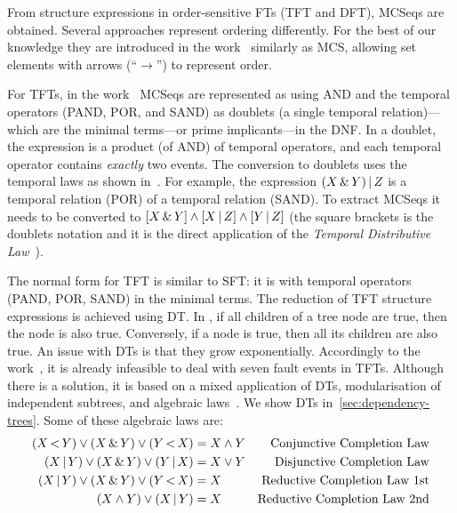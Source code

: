 \documentclass[12pt,openright,twoside,a4paper,oldfontcommands,english,brazil,final]{abntex2}
\theoremstyle{theo}
\newcommand{\parsin}[1]{\ensuremath\left( #1 \right)}
\newcommand{\squaresin}[1]{\ensuremath\left[ #1 \right]}
\def\pand{\ensuremath\operatorname{<}}
\def\por{\ensuremath\operatorname{|}}
\def\sand{\ensuremath\operatorname{\&}}
\begin{document}
From structure expressions in order-sensitive \acp{FT} (\ac{TFT} and \ac{DFT}), \acp{MCSeq} are obtained.
Several approaches represent  ordering differently.
For the best of our knowledge they are introduced in the work~\cite{TD2004} similarly as \ac{MCS}, allowing set elements with arrows (``$\rightarrow$'') to represent order.

For \acp{TFT}, in the work~\cite{Walker2009} \acp{MCSeq} are represented as  using \ac{AND} and the temporal operators (\ac{PAND}, \ac{POR}, and \ac{SAND}) as doublets (a single temporal relation)---which are the minimal terms---or prime implicants---in the \ac{DNF}.
In a doublet, the expression is a product (of \ac{AND}) of temporal operators, and each temporal operator contains \emph{exactly} two events.
The conversion to doublets uses the temporal laws as shown in~\cite{Walker2009}.
For example, the expression $\parsin{X \sand Y} \por Z$ is a temporal relation (\ac{POR}) of a temporal relation (\ac{SAND}).
To extract \acp{MCSeq} it needs to be converted to $\squaresin{X \sand Y} \land \squaresin{X \por Z} \land \squaresin{Y \por Z} $ (the square brackets is the doublets notation and it is the direct application of the \emph{Temporal Distributive Law}~\cite[p. 120]{Walker2009}).

The normal form for \ac{TFT} is similar to \ac{SFT}: it is  with temporal operators (\ac{PAND}, \ac{POR}, \ac{SAND}) in the minimal terms.
The reduction of \ac{TFT} structure expressions is achieved using \ac{DT}.
In , if all children of a tree node are true, then the node is also true.
Conversely, if a node is true, then all its children are also true.
An issue with \acp{DT} is that they grow exponentially.
Accordingly to the work~\cite{WP2010}, it is already infeasible to deal with seven fault events in TFTs.
Although there is a solution, it is based on a mixed application of \acp{DT}, modularisation of independent subtrees, and algebraic laws~\cite{WP2009}.
We show \acp{DT} in~\cref{sec:dependency-trees}.
Some of these algebraic laws are:
%
\begin{subequations}
\begin{align}
  \parsin{X \pand Y} \lor \parsin{X \sand Y} \lor \parsin{Y \pand X} &= X \land Y & \text{Conjunctive Completion Law}\label{law:tft-conjunctive-completion-law}\\
  \parsin{X \por Y} \lor \parsin{X \sand Y} \lor \parsin{Y \por X} &= X \lor Y & \text{Disjunctive Completion Law}\\
  \parsin{X \por Y} \lor \parsin{X \sand Y} \lor \parsin{Y \pand X} &= X & \text{Reductive Completion Law 1st}\\
  \parsin{X \land Y} \lor \parsin{X \por Y}  &= X & \text{Reductive Completion Law 2nd}
\end{align}
\end{subequations}
\end{document}
